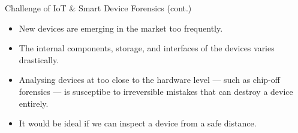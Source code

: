 \documentclass[handout]{beamer}
\begin{document}
\begin{frame}{Challenge of IoT \& Smart Device Forensics (cont.)}  

\begin{itemize}
\footnotesize
\item New devices are emerging in the market too frequently.
\vspace{10pt}
\item The internal components, storage, and interfaces of the devices varies drastically.
\vspace{10pt}
\item Analysing devices at too close to the hardware level --- such as chip-off forensics --- is susceptibe to irreversible mistakes that can destroy a device entirely.
\vspace{10pt}
\item It would be ideal if we can inspect a device from a safe distance.
\end{itemize}

\end{frame}
\end{document}

